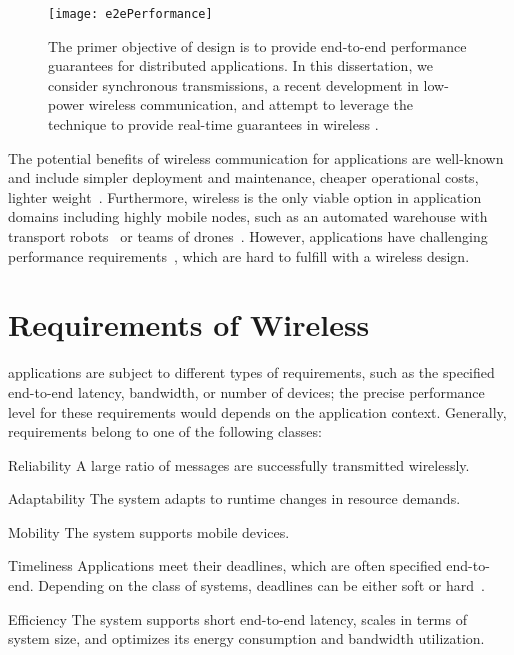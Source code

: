 \begin{figure}
  \centering
  \texttt{[image: e2ePerformance]}
  \caption{The primer objective of \CPS design is to provide end-to-end performance guarantees for distributed applications.
	{In this dissertation, we consider synchronous transmissions, a recent development in low-power wireless communication, and attempt to leverage the technique to provide real-time guarantees in wireless \CPS.}}
  \label{fig:e2ePerf}
\end{figure}

The potential benefits of wireless communication for \CPS applications are well-known and include \eg simpler deployment and maintenance, cheaper operational costs, lighter weight~\cite{luvisotto2017Ultra}.
Furthermore, wireless is the only viable option in application domains including highly mobile nodes, such as an automated warehouse with transport robots~\cite{haegele2018Logistics} or teams of drones~\cite{mottola2014Teamlevela}.
However, \CPS applications have challenging performance requirements~\cite{akerberg2011Future}, which are hard to fulfill with a wireless design.


\section{Requirements of Wireless \CPS}

\CPS applications are subject to different types of requirements, such as the specified end-to-end latency, bandwidth, or number of devices; the precise performance level for these requirements would depends on the application context.
Generally, \CPS requirements belong to one of the following classes:

\begin{features}[labelwidth=65pt, leftmargin=(\labelwidth+\labelsep)]

  \item[Reliability]
  A large ratio of messages are successfully transmitted wirelessly.

  \item[Adaptability]
  The system adapts to runtime changes in resource demands.

	\item[Mobility]
  The system supports mobile devices.

	\item[Timeliness]
  Applications meet their deadlines, which are often specified end-to-end. Depending on the class of systems, deadlines can be either soft or hard~\cite{buttazzo2011HardRT}.

  \item[Efficiency]
  The system
  supports short end-to-end latency,
  scales in terms of system size,
  and
  optimizes its energy consumption and bandwidth utilization.

\end{features}


